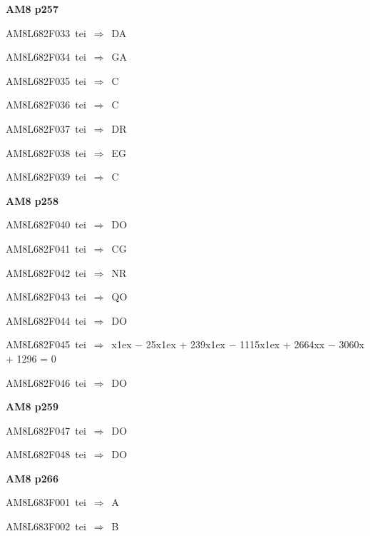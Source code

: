 \par\vfill\eject
{\bf\hfill AM8 p257\hfill\hbox{}}\par\bigskip
{\sixrm AM8L682F033\ {\sixit tei}\ }$\Rightarrow$\ DA\par\smallskip
{\sixrm AM8L682F034\ {\sixit tei}\ }$\Rightarrow$\ GA\par\smallskip
{\sixrm AM8L682F035\ {\sixit tei}\ }$\Rightarrow$\ C\par\smallskip
{\sixrm AM8L682F036\ {\sixit tei}\ }$\Rightarrow$\ C\par\smallskip
{\sixrm AM8L682F037\ {\sixit tei}\ }$\Rightarrow$\ DR\par\smallskip
{\sixrm AM8L682F038\ {\sixit tei}\ }$\Rightarrow$\ EG\par\smallskip
{\sixrm AM8L682F039\ {\sixit tei}\ }$\Rightarrow$\ C\par\smallskip

\par\vfill\eject
{\bf\hfill AM8 p258\hfill\hbox{}}\par\bigskip
{\sixrm AM8L682F040\ {\sixit tei}\ }$\Rightarrow$\ DO\par\smallskip
{\sixrm AM8L682F041\ {\sixit tei}\ }$\Rightarrow$\ CG\par\smallskip
{\sixrm AM8L682F042\ {\sixit tei}\ }$\Rightarrow$\ NR\par\smallskip
{\sixrm AM8L682F043\ {\sixit tei}\ }$\Rightarrow$\ QO\par\smallskip
{\sixrm AM8L682F044\ {\sixit tei}\ }$\Rightarrow$\ DO\par\smallskip
{\sixrm AM8L682F045\ {\sixit tei}\ }$\Rightarrow$\ {\tenit x}\raise1ex\hbox{} − 25{\tenit x}\raise1ex\hbox{} + 239{\tenit x}\raise1ex\hbox{} − 1115{\tenit x}\raise1ex\hbox{} + 2664{\tenit xx} − 3060{\tenit x} 
+ 1296 = 0\par\smallskip
{\sixrm AM8L682F046\ {\sixit tei}\ }$\Rightarrow$\ DO\par\smallskip

\par\vfill\eject
{\bf\hfill AM8 p259\hfill\hbox{}}\par\bigskip
{\sixrm AM8L682F047\ {\sixit tei}\ }$\Rightarrow$\ DO\par\smallskip
{\sixrm AM8L682F048\ {\sixit tei}\ }$\Rightarrow$\ DO\par\smallskip

\par\vfill\eject
{\bf\hfill AM8 p266\hfill\hbox{}}\par\bigskip
{\sixrm AM8L683F001\ {\sixit tei}\ }$\Rightarrow$\ A\par\smallskip
{\sixrm AM8L683F002\ {\sixit tei}\ }$\Rightarrow$\ B\par\smallskip

